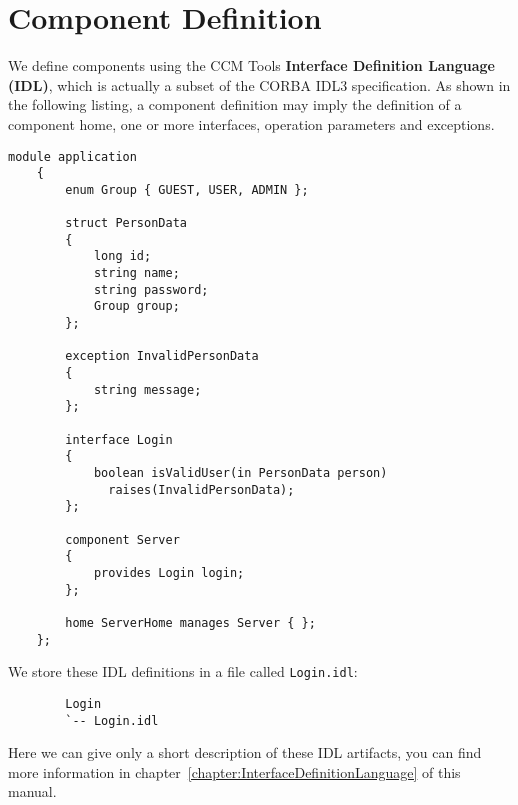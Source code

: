 \section{Component Definition}
\label{section:ComponentDefinition}

We define components using the CCM Tools 
{\bf Interface Definition Language (IDL)}, which is actually a subset of the
CORBA IDL3 specification.
As shown in the following listing, a component definition may imply the
definition of a component home, one or more interfaces, operation parameters and
exceptions. 

\begin{footnotesize}
\begin{lstlisting}[language=IDL]
    module application
    {
        enum Group { GUEST, USER, ADMIN };

        struct PersonData
        {
            long id;
            string name;
            string password;
            Group group;
        };

        exception InvalidPersonData
        {
            string message;
        };

        interface Login
        {
            boolean isValidUser(in PersonData person)
              raises(InvalidPersonData);
        };

        component Server
        {
            provides Login login; 
        };

        home ServerHome manages Server { };
    };
\end{lstlisting}
\end{footnotesize}

We store these IDL definitions in a file called {\tt Login.idl}:
\begin{footnotesize}
\begin{verbatim}
        Login
        `-- Login.idl
\end{verbatim}
\end{footnotesize}

Here we can give only a short description of these IDL artifacts, you can find 
more information in chapter~\ref{chapter:InterfaceDefinitionLanguage} of this manual.

